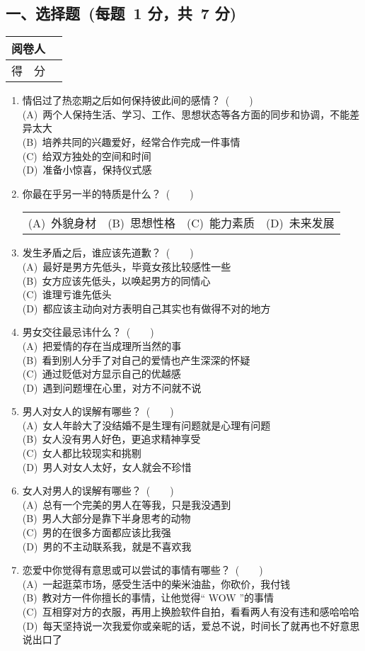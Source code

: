 \documentclass[twocolumn,landscape,UTF8]{ctexart}
\makeatletter
\newcommand{\fourch}[4]{\\\begin{tabular}{*{4}{@{}p{3.5cm}}}
		(A)~#1 & (B)~#2 & (C)~#3 & (D)~#4\end{tabular}} %
\newcommand{\twoch}[4]{\\\begin{tabular}{*{2}{@{}p{7cm}}}
		(A)~#1 & (B)~#2\end{tabular}\\\begin{tabular}{*{2}{@{}p{7cm}}}(C)~#3 &		(D)~#4\end{tabular}}  %
\newcommand{\onech}[4]{\\(A)~#1 \\ (B)~#2 \\ (C)~#3 \\ (D)~#4}  %
\makeatother
\begin{document}
	\begin{spacing}{1.3}
		
		\section*{\hspace{5cm} 一、选择题~(每题~1 分，共~7 分)}
		\vspace{-2cm}
		\begin{tabular}{|p{}|p{}|}
			\hline
			\centering 阅卷人& \\
			\hline
			\centering 得~~分 &  \\
			\hline
		\end{tabular}
		
\begin{enumerate}\setcounter{enumi}{0}
	
\item 情侣过了热恋期之后如何保持彼此间的感情？~(~~~~)
\onech
{两个人保持生活、学习、工作、思想状态等各方面的同步和协调，不能差异太大}
{培养共同的兴趣爱好，经常合作完成一件事情}
{给双方独处的空间和时间}
{准备小惊喜，保持仪式感}

\item 你最在乎另一半的特质是什么？~(~~~~)
\fourch{外貌身材}{思想性格}{能力素质}{未来发展}
			
\item 发生矛盾之后，谁应该先道歉？~(~~~~)
\onech
{最好是男方先低头，毕竟女孩比较感性一些}
{女方应该先低头，以唤起男方的同情心}
{谁理亏谁先低头}
{都应该主动向对方表明自己其实也有做得不对的地方}
			
\item 男女交往最忌讳什么？~(~~~~)
\onech
{把爱情的存在当成理所当然的事}
{看到别人分手了对自己的爱情也产生深深的怀疑}
{通过贬低对方显示自己的优越感}
{遇到问题埋在心里，对方不问就不说}

\item 男人对女人的误解有哪些？~(~~~~)
\onech
{女人年龄大了没结婚不是生理有问题就是心理有问题}
{女人没有男人好色，更追求精神享受}
{女人都比较现实和挑剔}
{男人对女人太好，女人就会不珍惜}

\item 女人对男人的误解有哪些？~(~~~~)
\onech  %
{总有一个完美的男人在等我，只是我没遇到}
{男人大部分是靠下半身思考的动物}
{男的在很多方面都应该比我强}
{男的不主动联系我，就是不喜欢我}

\item 恋爱中你觉得有意思或可以尝试的事情有哪些？~(~~~~)
\onech
{一起逛菜市场，感受生活中的柴米油盐，你砍价，我付钱}
{教对方一件你擅长的事情，让他觉得“ WOW ”的事情}
{互相穿对方的衣服，再用上换脸软件自拍，看看两人有没有违和感哈哈哈}
{每天坚持说一次我爱你或亲昵的话，爱总不说，时间长了就再也不好意思说出口了}


\end{enumerate}
\end{spacing}
\end{document}
